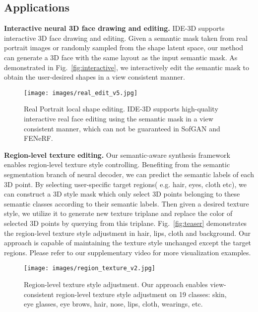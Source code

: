 \documentclass[acmtog]{acmart}
\begin{document}
\subsection{Applications}
\label{sec:4.3}
\noindent \textbf{Interactive neural 3D face drawing and editing.} IDE-3D supports interactive 3D face drawing and editing. Given a semantic mask taken from real portrait images or randomly sampled from the shape latent space, our method can generate a 3D face with the same layout as the input semantic mask. As demonstrated in Fig.~\ref{fig:interactive}, we interactively edit the semantic mask to obtain the user-desired shapes in a view consistent manner. 



\begin{figure}
  \centering
  \texttt{[image: images/real\_edit\_v5.jpg]}
  \caption{Real Portrait local shape editing. IDE-3D supports high-quality interactive real face editing using the semantic mask in a view consistent manner, which can not be guaranteed in SofGAN and FENeRF.}
  \Description{}
  \label{fig:real_edit}
\end{figure}

\noindent \textbf{Region-level texture editing.} Our semantic-aware synthesis framework enables region-level texture style controlling. Benefiting from the semantic segmentation branch of neural decoder, we can predict the semantic labels of each 3D point. By selecting user-specific target regions( e.g. hair, eyes, cloth etc), we can construct a 3D style mask which only select 3D points belonging to these semantic classes according to their semantic labels. Then given a desired texture style, we utilize it to generate new texture triplane and replace the color of selected 3D points by querying from this triplane. Fig.~\ref{fig:teaser} demonstrates the region-level texture style adjustment in hair, lips, cloth and background. Our approach is capable of maintaining the texture style unchanged except the target regions. Please refer to our supplementary video for more visualization examples. 
\begin{figure}
 \centering
 \texttt{[image: images/region\_texture\_v2.jpg]}
 \caption{Region-level texture style adjustment. Our approach enables view-consistent region-level texture style adjustment on 19 classes: skin, eye glasses, eye brows, hair, nose, lips, cloth, wearings, etc.}
 \Description{}
 \label{texture editing}
\end{figure}
\end{document}
